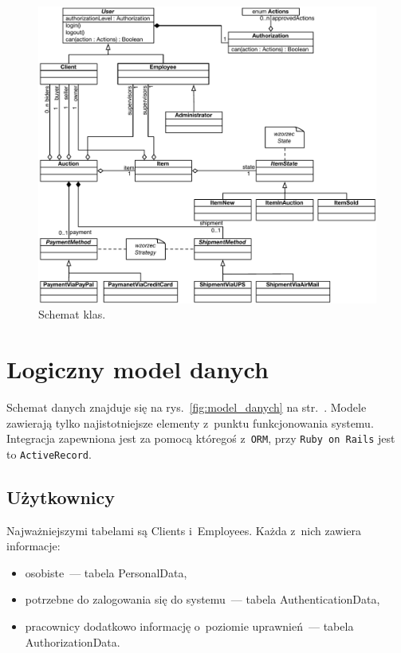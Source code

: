 \documentclass[10pt,a4paper]{article}
\newcommand{\f}[1]{\texttt{#1}}
\newcommand{\s}[1]{\textsf{#1}}
\begin{document}
\begin{figure}[p]
  \begin{adjustwidth}{-3cm}{-3cm}
    \centering
    \includegraphics{figury/diagram-klas}
    \caption{Schemat klas.}
    \label{fig:diagram_klas}
  \end{adjustwidth}
\end{figure}

\newpage
\section{Logiczny model danych}

Schemat danych znajduje się na rys.~\ref{fig:model_danych} na
str.~\pageref{fig:model_danych}. Modele zawierają tylko najistotniejsze
elementy z~punktu funkcjonowania systemu. Integracja zapewniona jest za pomocą
któregoś z~\f{ORM}, przy \f{Ruby on Rails} jest to \f{ActiveRecord}.

\subsection{Użytkownicy}

\noindent Najważniejszymi tabelami są \s{Clients} i~\s{Employees}. Każda z~nich
zawiera informacje:

\begin{itemize}
  \item osobiste~--- tabela \s{PersonalData},
  \item potrzebne do zalogowania się do systemu~--- tabela
    \s{AuthenticationData},
  \item pracownicy dodatkowo informację o~poziomie uprawnień~--- tabela
    \s{AuthorizationData}.
\end{itemize}
\end{document}
